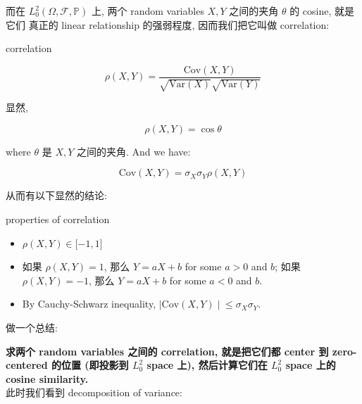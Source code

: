 \documentclass{qlnotes-export}
\begin{document}
而在 \(L_{0}^{2}(\Omega,\mathcal{F},{\mathbb{P}})\) 上, 两个 random variables \(X,Y\) 之间的夹角 \(\theta\) 的 cosine, 就是它们 真正的 linear relationship 的强弱程度, 因而我们把它叫做 correlation:

\begin{definition}{correlation}\label{def-02-random-variables-correlation}

\[\rho(X,Y) = \frac{\text{Cov}(X,Y)}{\sqrt{\text{Var}(X)}\sqrt{\text{Var}(Y)}}\]

\end{definition}

显然,

\[\rho(X,Y) = \cos\theta\]

where \(\theta\) 是 \(X,Y\) 之间的夹角. And we have:

\[\text{Cov}(X,Y) = \sigma_{X}\sigma_{Y}\rho(X,Y)\]

从而有以下显然的结论:

\begin{proposition}{properties of correlation}\label{prop-02-random-variables-properties-of-correlation}

\begin{itemize}
\item
  \(\rho(X,Y) \in \lbrack - 1,1\rbrack\)
\item
  如果 \(\rho(X,Y) = 1\), 那么 \(Y = aX + b\) for some \(a > 0\) and \(b\); 如果 \(\rho(X,Y) = - 1\), 那么 \(Y = aX + b\) for some \(a < 0\) and \(b\).~
\item
  By Cauchy-Schwarz inequality, \(\left. |\text{Cov}(X,Y) \middle| \leq \sigma_{X}\sigma_{Y} \right.\).
\end{itemize}

\end{proposition}

做一个总结:

\begin{center}

\end{center}

\textbf{求两个 random variables 之间的 correlation, 就是把它们都 center 到 zero-centered 的位置 (即投影到 \(L_{0}^{2}\) space 上), 然后计算它们在 \(L_{0}^{2}\) space 上的 cosine similarity.}\\
此时我们看到 decomposition of variance:
\end{document}
